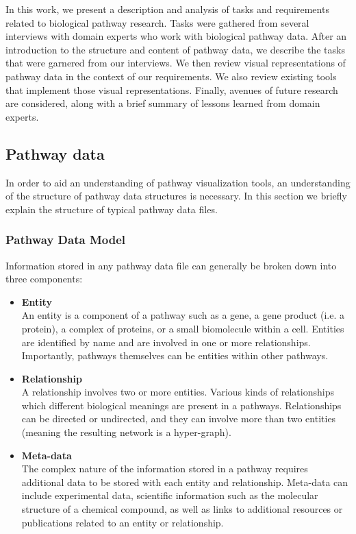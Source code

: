 \documentclass{egpubl}
\begin{document}

In this work, we present a description and analysis of tasks and requirements related to biological pathway research.
Tasks were gathered from several interviews with domain experts who work with biological pathway data.
After an introduction to the structure and content of pathway data, we describe the tasks that were garnered from our interviews.
We then review visual representations of pathway data in the context of our requirements.
We also review existing tools that implement those visual representations.
Finally, avenues of future research are considered, along with a brief summary of lessons learned from domain experts.

\subsection{Pathway data}

In order to aid an understanding of pathway visualization tools, an understanding of the structure of pathway data structures is necessary.
In this section we briefly explain the structure of typical pathway data files.

\subsubsection{Pathway Data Model}

Information stored in any pathway data file can generally be broken down into three components:

\begin{itemize}

\item \textbf{Entity}\\
An entity is a component of a pathway such as a gene, a gene product (i.e. a protein), a complex of proteins, or a small biomolecule within a cell.
Entities are identified by name and are involved in one or more relationships.
Importantly, pathways themselves can be entities within other pathways.
\item \textbf{Relationship}\\
A relationship involves two or more entities.
Various kinds of relationships which different biological meanings are present in a pathways.
Relationships can be directed or undirected, and they can involve more than two entities (meaning the resulting network is a hyper-graph).
\item \textbf{Meta-data}\\
The complex nature of the information stored in a pathway requires additional data to be stored with each entity and relationship.
Meta-data can include experimental data, scientific information such as the molecular structure of a chemical compound, as well as links to additional resources or publications related to an entity or relationship.

\end{itemize}
\end{document}
